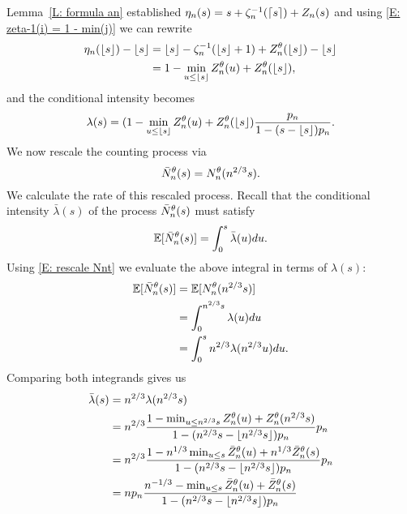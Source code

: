 Lemma~\ref{L: formula an} established $\eta_n(s) = s + \zeta^{-1}_n(\lceil s\rceil) + Z_n(s)$ 
and using \eqref{E: zeta-1(i) = 1 - min(j)} we can rewrite
\begin{equation*}
\begin{aligned}
\eta_n(\lfloor s\rfloor) - \lfloor s\rfloor 
&= \lfloor s\rfloor - \zeta^{-1}_n(\lfloor s\rfloor+1) + Z_n^{\theta}(\lfloor s\rfloor) - \lfloor s\rfloor \\
&= 1 - \min_{u \leq \lfloor s\rfloor} Z_n^{\theta}(u) + Z_n^{\theta}(\lfloor s\rfloor),
\end{aligned}
\end{equation*}
and the conditional intensity becomes
\begin{equation} \label{E: rate Nnt 2}
\lambda(s) = (1 - \min_{u \leq \lfloor s\rfloor} Z_n^{\theta}(u) + Z_n^{\theta}(\lfloor s\rfloor) \frac{p_n}{1-(s-\lfloor s\rfloor)p_n}.
\end{equation}
We now rescale the counting process via
\begin{equation} \label{E: rescale Nnt}
\bar{N}_n^{\theta}(s) = N_n^{\theta}(n^{2 / 3}s).
\end{equation}
We calculate the rate of this rescaled process.
Recall that the conditional intensity $\bar{\lambda}(s)$ of the process $\bar{N}_n^{\theta}(s)$ must satisfy
\begin{equation}
\mathbb{E}[\bar{N}_n^{\theta}(s)] = \int_{0}^{s} \bar{\lambda}(u) du.
\end{equation}
Using \eqref{E: rescale Nnt} we evaluate the above integral in terms of $\lambda(s)$:
\begin{equation*}
\begin{aligned}
\mathbb{E}[\bar{N}_n^{\theta}(s)]
&= \mathbb{E}[N_n^{\theta}(n^{2 / 3}s)] \\
&= \int_{0}^{n^{2 / 3}s} \lambda(u) du \\
&= \int_{0}^{s} n^{2 / 3} \lambda(n^{2 / 3}u) du.
\end{aligned}
\end{equation*}
Comparing both integrands gives us
\begin{equation} \label{E: conditional intensity final}
\begin{aligned}
\bar{\lambda}(s)
&= n^{2 / 3} \lambda(n^{2 / 3}s) \\
&= n^{2 / 3} \frac{1 - \min_{u \leq n^{2 / 3}s} Z_n^{\theta}(u) + Z_n^{\theta}(n^{2 / 3}s)}{1 - (n^{2 / 3}s - \lfloor n^{2 / 3}s\rfloor)p_n} p_n \\
&= n^{2 / 3} \frac{1 - n^{1 / 3} \min_{u \leq s} \bar{Z}^{\theta}_n(u) + n^{1 / 3}\bar{Z}^{\theta}_n(s)}{1 - (n^{2 / 3}s - \lfloor n^{2 / 3}s\rfloor)p_n} p_n \\
&= n p_n \frac{n^{-1 / 3} - \min_{u \leq s} \bar{Z}^{\theta}_n(u) + \bar{Z}^{\theta}_n(s)}{1 - (n^{2 / 3}s - \lfloor n^{2 / 3}s\rfloor)p_n}
\end{aligned}
\end{equation}

